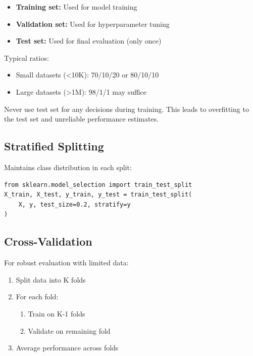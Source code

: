 \begin{itemize}
    \item \textbf{Training set:} Used for model training
    \item \textbf{Validation set:} Used for hyperparameter tuning
    \item \textbf{Test set:} Used for final evaluation (only once)
\end{itemize}

Typical ratios:
\begin{itemize}
    \item Small datasets (<10K): 70/10/20 or 80/10/10
    \item Large datasets (>1M): 98/1/1 may suffice
\end{itemize}

\begin{note}
Never use test set for any decisions during training. This leads to overfitting to the test set and unreliable performance estimates.
\end{note}

\subsection{Stratified Splitting}

Maintains class distribution in each split:
\begin{verbatim}
from sklearn.model_selection import train_test_split
X_train, X_test, y_train, y_test = train_test_split(
    X, y, test_size=0.2, stratify=y
)
\end{verbatim}

\subsection{Cross-Validation}

For robust evaluation with limited data:

\begin{algorithm}
\begin{enumerate}
    \item Split data into K folds
    \item For each fold:
    \begin{enumerate}
        \item Train on K-1 folds
        \item Validate on remaining fold
    \end{enumerate}
    \item Average performance across folds
\end{enumerate}
\end{algorithm}

